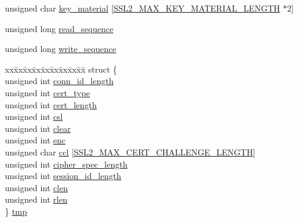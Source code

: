 \begin{DoxyCompactItemize}
\item 
unsigned char \hyperlink{structssl2__state__st_aa698c36f7ec4edb8a3184beebdfa2576}{key\+\_\+material} \mbox{[}\hyperlink{ssl_2ssl2_8h_a749468797a8124ecd23c6a69c0c36368}{S\+S\+L2\+\_\+\+M\+A\+X\+\_\+\+K\+E\+Y\+\_\+\+M\+A\+T\+E\+R\+I\+A\+L\+\_\+\+L\+E\+N\+G\+TH} $\ast$2\mbox{]}
\item 
unsigned long \hyperlink{structssl2__state__st_a6086e8942a30ca97a9571d3b2d18ab66}{read\+\_\+sequence}
\item 
unsigned long \hyperlink{structssl2__state__st_a0e6dc54a98fa9135fdd12766dac543f8}{write\+\_\+sequence}
\item 
\begin{tabbing}
xx\=xx\=xx\=xx\=xx\=xx\=xx\=xx\=xx\=\kill
struct \{\\
\>unsigned int \hyperlink{structssl2__state__st_aac92d44b1ad47635777ede390343bd11}{conn\_id\_length}\\
\>unsigned int \hyperlink{structssl2__state__st_a2bb1c4376b0c853c73d46703160f6c88}{cert\_type}\\
\>unsigned int \hyperlink{structssl2__state__st_a2583fe8e969237d09f449af15d6a3c06}{cert\_length}\\
\>unsigned int \hyperlink{structssl2__state__st_a2c7f3ea29ea669ae52d434ccc6046b9c}{csl}\\
\>unsigned int \hyperlink{structssl2__state__st_a9446900a3977792359b655add6754a1f}{clear}\\
\>unsigned int \hyperlink{structssl2__state__st_a351b336dde67c7824f93553242992db7}{enc}\\
\>unsigned char \hyperlink{structssl2__state__st_a6bfe609d1289aa450650310810938b33}{ccl} \mbox{[}\hyperlink{ssl_2ssl2_8h_a3fb0a83975dadfe0928cd1752b518215}{SSL2\_MAX\_CERT\_CHALLENGE\_LENGTH}\mbox{]}\\
\>unsigned int \hyperlink{structssl2__state__st_aeb38423853460bf1c28f72ddd06a54b3}{cipher\_spec\_length}\\
\>unsigned int \hyperlink{structssl2__state__st_aef3d2a4622055ed0cfb19d9d8f696ec2}{session\_id\_length}\\
\>unsigned int \hyperlink{structssl2__state__st_a6d09b72841914282a450ed092dce6141}{clen}\\
\>unsigned int \hyperlink{structssl2__state__st_a9749b9b1e812b509dfda17cb1de9296b}{rlen}\\
\} \hyperlink{structssl2__state__st_ad2dd07ed874222ee57960a071b8bc75a}{tmp}\\


\end{tabbing}
\end{DoxyCompactItemize}
